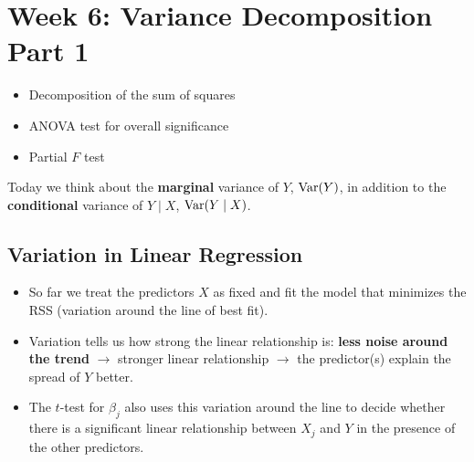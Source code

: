 
\section{Week 6: Variance Decomposition Part 1}

\begin{itemize}
    \item Decomposition of the sum of squares
    \item ANOVA test for overall significance
    \item Partial $F$ test
\end{itemize}
Today we think about the \textbf{marginal} variance of $Y$, $\operatorname{Var}(Y)$, in addition to
the \textbf{conditional} variance of $Y\mid X$, $\operatorname{Var}(Y\mid X)$.

\subsection{Variation in Linear Regression}

\begin{remark}
    \begin{itemize}
        \item So far we treat the predictors $X$ as fixed and fit the model that minimizes the
        RSS (variation around the line of best fit).
        \item Variation tells us how strong the linear relationship is: \textbf{less noise
        around the trend} $\to$ stronger linear relationship $\to$ the predictor(s) explain
        the spread of $Y$ better.
        \item The $t$-test for $\beta_j$ also uses this variation around the line to decide
        whether there is a significant linear relationship between $X_j$ and $Y$ in the
        presence of the other predictors.
    \end{itemize}
\end{remark}


